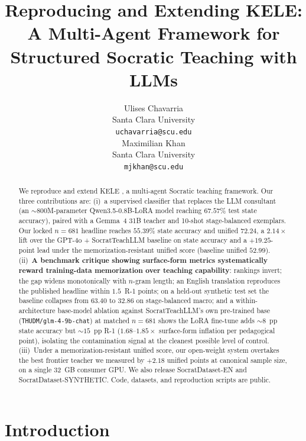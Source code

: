 \documentclass[11pt]{article}
\title{Reproducing and Extending KELE: A Multi-Agent Framework for Structured Socratic Teaching with LLMs}
\author{Ulises Chavarria \\
  Santa Clara University \\
  \texttt{uchavarria@scu.edu} \\\And
  Maximilian Khan \\
  Santa Clara University \\
  \texttt{mjkhan@scu.edu} \\}
\begin{document}
\maketitle

\begin{abstract}
We reproduce and extend KELE \citep{peng2025kele}, a multi-agent Socratic teaching framework. Our three contributions are: (i)~a supervised classifier that replaces the LLM consultant (an $\sim$800M-parameter Qwen3.5-0.8B-LoRA model reaching $67.57\%$ test state accuracy), paired with a Gemma~4 31B teacher and 10-shot stage-balanced exemplars. Our locked $n{=}681$ headline reaches $\mathbf{55.39\%}$ state accuracy and unified $\mathbf{72.24}$, a $\mathbf{2.14\times}$ lift over the GPT-4o + SocratTeachLLM baseline on state accuracy and a $\mathbf{+19.25}$-point lead under the memorization-resistant unified score (baseline unified $52.99$). (ii)~\textbf{A benchmark critique showing surface-form metrics systematically reward training-data memorization over teaching capability}: rankings invert; the gap widens monotonically with $n$-gram length; an English translation reproduces the published headline within $1.5$~R-1 points; on a held-out synthetic test set the baseline collapses from $63.40$ to $32.86$ on stage-balanced macro; and a within-architecture base-model ablation against SocratTeachLLM's own pre-trained base (\texttt{THUDM/glm-4-9b-chat}) at matched $n{=}681$ shows the LoRA fine-tune adds $\sim$$8$~pp state accuracy but $\sim$$15$~pp R-1 ($1.68$--$1.85\times$ surface-form inflation per pedagogical point), isolating the contamination signal at the cleanest possible level of control. (iii)~Under a memorization-resistant unified score, our open-weight system overtakes the best frontier teacher we measured by $\mathbf{+2.18}$ unified points at canonical sample size, on a single 32~GB consumer GPU. We also release SocratDataset-EN and SocratDataset-SYNTHETIC. Code, datasets, and reproduction scripts are public.
\end{abstract}

\section{Introduction}
\label{sec:intro}
\end{document}
